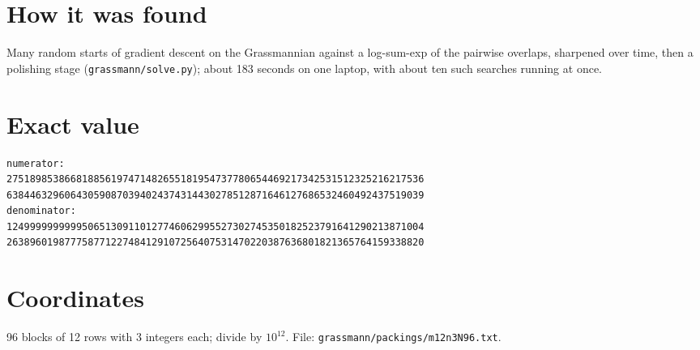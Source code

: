 \documentclass[11pt,a4paper]{article}
\begin{document}
\section{How it was found}
Many random starts of gradient descent on the Grassmannian against a log-sum-exp of the pairwise overlaps, sharpened over time, then a polishing stage (\texttt{grassmann/solve.py}); about 183 seconds on one laptop, with about ten such searches running at once.


\appendix
\section{Exact value}
{\small
\begin{verbatim}
numerator:
275189853866818856197471482655181954737780654469217342531512325216217536
638446329606430590870394024374314430278512871646127686532460492437519039
denominator:
124999999999950651309110127746062995527302745350182523791641290213871004
263896019877758771227484129107256407531470220387636801821365764159338820
\end{verbatim}}

\section{Coordinates}
96 blocks of 12 rows with 3 integers each; divide by $10^{12}$. File: \texttt{grassmann/packings/m12n3N96.txt}.
{\tiny
\begin{multicols}{3}
\end{multicols}}
\end{document}
